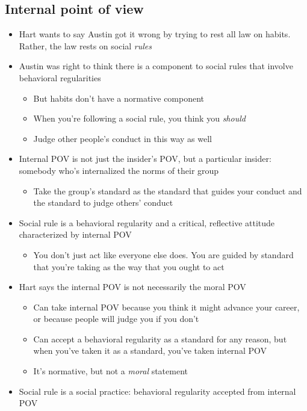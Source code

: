 \hypertarget{internal-point-of-view}{%
\subsection{Internal point of view}\label{internal-point-of-view}}

\begin{itemize}
\tightlist
\item
  Hart wants to say Austin got it wrong by trying to rest all law on
  habits. Rather, the law rests on social \emph{rules}
\item
  Austin was right to think there is a component to social rules that
  involve behavioral regularities

  \begin{itemize}
  \tightlist
  \item
    But habits don't have a normative component
  \item
    When you're following a social rule, you think you \emph{should}
  \item
    Judge other people's conduct in this way as well
  \end{itemize}
\item
  Internal POV is not just the insider's POV, but a particular insider:
  somebody who's internalized the norms of their group

  \begin{itemize}
  \tightlist
  \item
    Take the group's standard as the standard that guides your conduct
    and the standard to judge others' conduct
  \end{itemize}
\item
  Social rule is a behavioral regularity and a critical, reflective
  attitude characterized by internal POV

  \begin{itemize}
  \tightlist
  \item
    You don't just act like everyone else does. You are guided by
    standard that you're taking as the way that you ought to act
  \end{itemize}
\item
  Hart says the internal POV is not necessarily the moral POV

  \begin{itemize}
  \tightlist
  \item
    Can take internal POV because you think it might advance your
    career, or because people will judge you if you don't
  \item
    Can accept a behavioral regularity as a standard for any reason, but
    when you've taken it as a standard, you've taken internal POV
  \item
    It's normative, but not a \emph{moral} statement
  \end{itemize}
\item
  Social rule is a social practice: behavioral regularity accepted from
  internal POV
\end{itemize}

